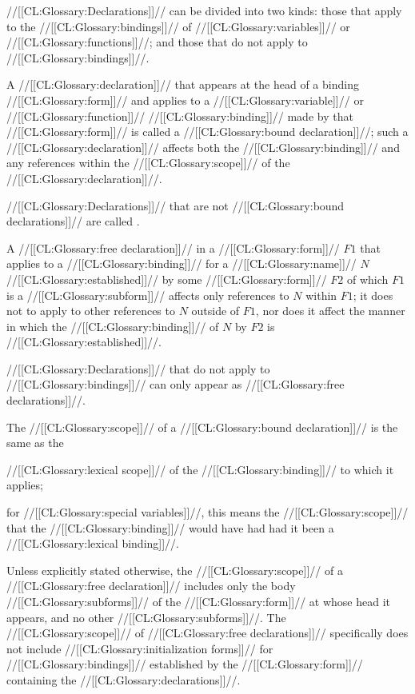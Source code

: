  

//[[CL:Glossary:Declarations]]// can be divided into two kinds: those that apply to the //[[CL:Glossary:bindings]]// of //[[CL:Glossary:variables]]// or //[[CL:Glossary:functions]]//; and those that do not apply to //[[CL:Glossary:bindings]]//.

A //[[CL:Glossary:declaration]]// that appears at the head of a binding //[[CL:Glossary:form]]//  and applies to a //[[CL:Glossary:variable]]// or //[[CL:Glossary:function]]// //[[CL:Glossary:binding]]//  made by that //[[CL:Glossary:form]]// is called a //[[CL:Glossary:bound declaration]]//;  such a //[[CL:Glossary:declaration]]// affects both the //[[CL:Glossary:binding]]// and any references within the //[[CL:Glossary:scope]]// of the //[[CL:Glossary:declaration]]//.  

//[[CL:Glossary:Declarations]]// that are not //[[CL:Glossary:bound declarations]]// are called .

A //[[CL:Glossary:free declaration]]// in a //[[CL:Glossary:form]]// $F1$ that applies to a //[[CL:Glossary:binding]]// for a //[[CL:Glossary:name]]// $N$ //[[CL:Glossary:established]]// by some //[[CL:Glossary:form]]// $F2$ of which $F1$ is a //[[CL:Glossary:subform]]// affects only references to $N$ within $F1$; it does not to apply to other references to $N$ outside of $F1$, nor does it affect the manner in which the //[[CL:Glossary:binding]]// of $N$ by $F2$ is //[[CL:Glossary:established]]//.

//[[CL:Glossary:Declarations]]// that do not apply to //[[CL:Glossary:bindings]]// can only appear  as //[[CL:Glossary:free declarations]]//.

   The //[[CL:Glossary:scope]]// of a //[[CL:Glossary:bound declaration]]// is the same as the

//[[CL:Glossary:lexical scope]]// of the //[[CL:Glossary:binding]]// to which it applies;

for //[[CL:Glossary:special variables]]//, this means the //[[CL:Glossary:scope]]// that the //[[CL:Glossary:binding]]//  would have had had it been a //[[CL:Glossary:lexical binding]]//.

Unless explicitly stated otherwise, the //[[CL:Glossary:scope]]// of a  //[[CL:Glossary:free declaration]]// includes only the body //[[CL:Glossary:subforms]]// of  the //[[CL:Glossary:form]]// at whose head it appears, and no other //[[CL:Glossary:subforms]]//. The //[[CL:Glossary:scope]]// of //[[CL:Glossary:free declarations]]// specifically does not include //[[CL:Glossary:initialization forms]]// for //[[CL:Glossary:bindings]]// established by the //[[CL:Glossary:form]]// containing the //[[CL:Glossary:declarations]]//.

